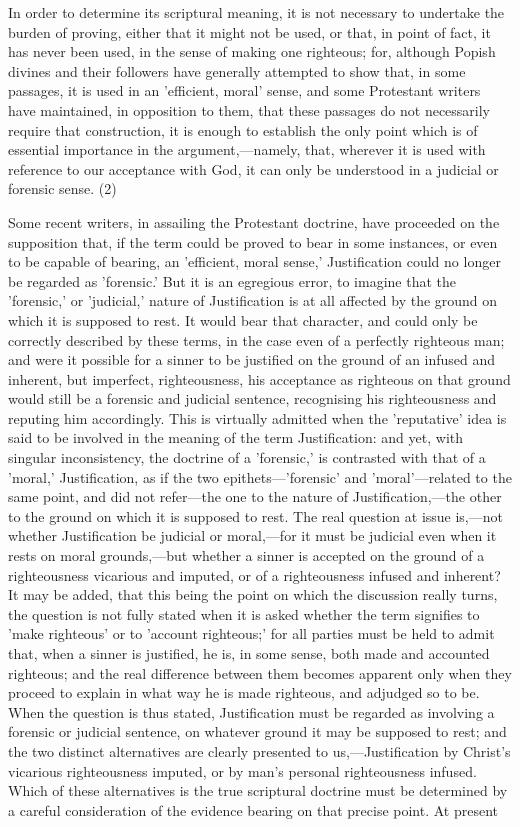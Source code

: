 \documentclass[
]{book}
\begin{document}
In order to determine its scriptural meaning, it is not necessary to undertake the burden of proving, either that it might not be used, or that, in point of fact, it has never been used, in the sense of making one righteous; for, although Popish divines and their followers have generally attempted to show that, in some passages, it is used in an 'efficient, moral' sense, and some Protestant writers have maintained, in opposition to them, that these passages do not necessarily require that construction, it is enough to establish the only point which is of essential importance in the argument,---namely, that, wherever it is used with reference to our acceptance with God, it can only be understood in a judicial or forensic sense. (2)

Some recent writers, in assailing the Protestant doctrine, have proceeded on the supposition that, if the term could be proved to bear in some instances, or even to be capable of bearing, an 'efficient, moral sense,' Justification could no longer be regarded as 'forensic.' But it is an egregious error, to imagine that the 'forensic,' or 'judicial,' nature of Justification is at all affected by the ground on which it is supposed to rest. It would bear that character, and could only be correctly described by these terms, in the case even of a perfectly righteous man; and were it possible for a sinner to be justified on the ground of an infused and inherent, but imperfect, righteousness, his acceptance as righteous on that ground would still be a forensic and judicial sentence, recognising his righteousness and reputing him accordingly. This is virtually admitted when the 'reputative' idea is said to be involved in the meaning of the term Justification: and yet, with singular inconsistency, the doctrine of a 'forensic,' is contrasted with that of a 'moral,' Justification, as if the two epithets---'forensic' and 'moral'---related to the same point, and did not refer---the one to the nature of Justification,---the other to the ground on which it is supposed to rest. The real question at issue is,---not whether Justification be judicial or moral,---for it must be judicial even when it rests on moral grounds,---but whether a sinner is accepted on the ground of a righteousness vicarious and imputed, or of a righteousness infused and inherent? It may be added, that this being the point on which the discussion really turns, the question is not fully stated when it is asked whether the term signifies to 'make righteous' or to 'account righteous;' for all parties must be held to admit that, when a sinner is justified, he is, in some sense, both made and accounted righteous; and the real difference between them becomes apparent only when they proceed to explain in what way he is made righteous, and adjudged so to be. When the question is thus stated, Justification must be regarded as involving a forensic or judicial sentence, on whatever ground it may be supposed to rest; and the two distinct alternatives are clearly presented to us,---Justification by Christ's vicarious righteousness imputed, or by man's personal righteousness infused. Which of these alternatives is the true scriptural doctrine must be determined by a careful consideration of the evidence bearing on that precise point. At present 
\end{document}

